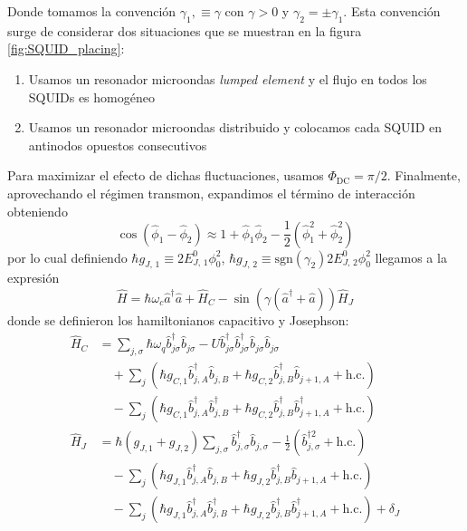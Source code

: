 Donde tomamos la convención $\gamma_1, \equiv \gamma$ con $\gamma > 0$ y $\gamma_2 = \pm \gamma_1$. Esta convención surge de considerar dos situaciones que se muestran en la figura \ref{fig:SQUID_placing}:
\begin{enumerate}
    \item Usamos un resonador microondas \textit{lumped element} y el flujo en todos los SQUIDs es homogéneo
    \item Usamos un resonador microondas distribuido y colocamos cada SQUID en antinodos opuestos consecutivos
\end{enumerate}
Para maximizar el efecto de dichas fluctuaciones, usamos $\Phi_{\text{DC}} = \pi/2$. Finalmente, aprovechando el régimen transmon, expandimos el término de interacción obteniendo
\begin{equation}
    \cos(\hat \phi_1 - \hat \phi_2) \approx 1 + \hat \phi_1 \hat \phi_2 - \frac{1}{2}(\hat \phi_1^2 + \hat \phi_2^2)
\end{equation}
por lo cual definiendo $\hbar g_{J,\,1} \equiv 2E_{J,\,1}^0\phi_0^2$, $\hbar g_{J, \, 2} \equiv \text{sgn}(\gamma_2) 2E_{J, \, 2}^0 \phi_0^2$ llegamos a la expresión
\begin{equation}
    \hat H = \hbar \omega_c \hat a^\dag \hat a + \hat H_C 
                - \sin\!\left(\gamma(\hat a^\dag + \hat a)\right) \hat H_J
\end{equation}
donde se definieron los hamiltonianos capacitivo y Josephson: 
\begin{subequations}
    \begin{align}
        \hat H_C &= \sum_{j, \sigma} \hbar \omega_q \hat b^\dag_{j\sigma} \hat b_{j\sigma} - U\hat b^\dag_{j\sigma}\hat b^\dag_{j\sigma}\hat b_{j\sigma}\hat b_{j\sigma}\nonumber\\
                &\quad+ \sum_j \left(\hbar g_{C,1}\hat b^\dag_{j,A}\hat b_{j,B} + \hbar g_{C,2}\hat b^\dag_{j,B} \hat b_{j+1,A} +\text{h.c.}\right)\nonumber\\ 
               &\quad-\sum_j \left(\hbar g_{C,1}\hat b^\dag_{j,A}\hat b^\dag_{j,B} + \hbar g_{C,2}\hat b^\dag_{j,B} \hat b^\dag_{j+1,A}+\text{h.c.} \right) \label{eq:capacitive_hamiltonian}\\
        \hat H_J &= \hbar(g_{J,1} + g_{J,2})\sum_{j,\sigma}  
                \hat b^\dag_{j,\sigma}\hat b_{j,\sigma} 
                - \frac{1}{2}\left(\hat b^{\dag 2}_{j,\sigma} + \text{h.c.}\right) \nonumber\\
               &\quad - \sum_j \left(\hbar g_{J,1}\hat b^\dag_{j,A}\hat b_{j,B} 
                + \hbar g_{J,2}\hat b^\dag_{j,B} \hat b_{j+1,A} + \text{h.c.}\right) \nonumber\\
               &\quad - \sum_j \left(\hbar g_{J,1}\hat b^\dag_{j,A}\hat b^\dag_{j,B} 
                + \hbar g_{J,2}\hat b^\dag_{j,B} \hat b^\dag_{j+1,A} + \text{h.c.}\right) + \delta_J \label{eq:Josephson_H_real}
    \end{align}\label{eq:real_space_hamiltonians}
\end{subequations}
